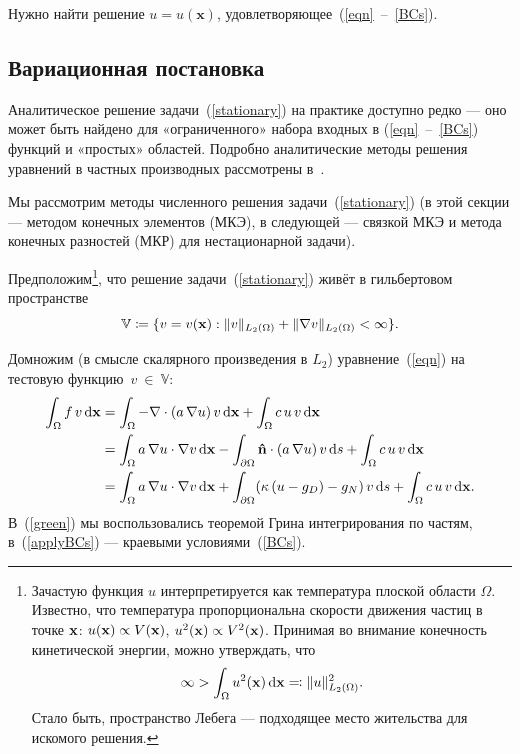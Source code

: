 Нужно найти решение $u = u(\textbf{x})$, удовлетворяющее~(\ref{eqn}~--~\ref{BCs}).

\subsection{Вариационная постановка}
\label{Galerkin}

Аналитическое решение задачи~(\ref{stationary}) на практике доступно редко --- оно может быть найдено для «ограниченного» набора входных в (\ref{eqn}~--~\ref{BCs}) функций и «простых» областей. Подробно аналитические методы решения уравнений в частных производных рассмотрены в~\cite{PDEs}.

Мы рассмотрим методы численного решения задачи~(\ref{stationary}) (в этой секции --- методом конечных элементов (МКЭ), в следующей --- связкой МКЭ и метода конечных разностей (МКР) для нестационарной задачи). 

Предположим\footnote{
	Зачастую функция $u$ интерпретируется как температура плоской области $\Omega$. Известно, что температура пропорциональна скорости движения частиц в точке $\boldsymbol{\mathbf{x}}$: $u(\boldsymbol{\mathbf{x}}) \propto V(\boldsymbol{\mathbf{x}})$, $u^2(\boldsymbol{\mathbf{x}}) \propto V^2(\boldsymbol{\mathbf{x}})$. Принимая во внимание конечность кинетической энергии, можно утверждать, что 
	$$
		\infty > \int_\Omega u^2(\vect{x}) \diff{\vect{x}} \eqqcolon \normL{u}^2.
	$$
	Стало быть, пространство Лебега --- подходящее место жительства для искомого решения.
}, что решение задачи~(\ref{stationary}) живёт в гильбертовом пространстве 
\begin{equation}
\label{V}
	\mathbb{V} \coloneqq \{ v = v(\vect{x}): \normL{v} + \normL{\nabla v} < \infty \}.
\end{equation}

Домножим (в смысле скалярного произведения в $L_2$) уравнение~(\ref{eqn}) на тестовую функцию~$v~\in~\mathbb{V}$:
\begin{subequations}
\label{multByTestFunc}
	\begin{align}
		\int_{\Omega} f \, v \diff{\vect{x}}  
		&= 
		\int_{\Omega} - \nabla \cdot (a \, \nabla u) \, v \diff{\vect{x}}  + 
		\int_{\Omega} c \, u \, v \diff{\vect{x}}  \\
		&= 
		\int_{\Omega} a \, \nabla u \cdot \nabla v \diff{\vect{x}}  -
		\int_{\partial \Omega} \vect{\hat{n}} \cdot (a \, \nabla u) \, v \diff{s} +
		\int_{\Omega} c \, u \, v \diff{\vect{x}}  \label{green} \\
		&= 
		\int_{\Omega} a \, \nabla u \cdot \nabla v \diff{\vect{x}}  +
		\int_{\partial \Omega} ( \kappa \, (u - g_D) - g_N ) \, v \diff{s} +
		\int_{\Omega} c \, u \, v \diff{\vect{x}} . \label{applyBCs}
	\end{align}
\end{subequations}
В~(\ref{green}) мы воспользовались теоремой Грина интегрирования по частям, в~(\ref{applyBCs}) --- краевыми условиями~(\ref{BCs}).

